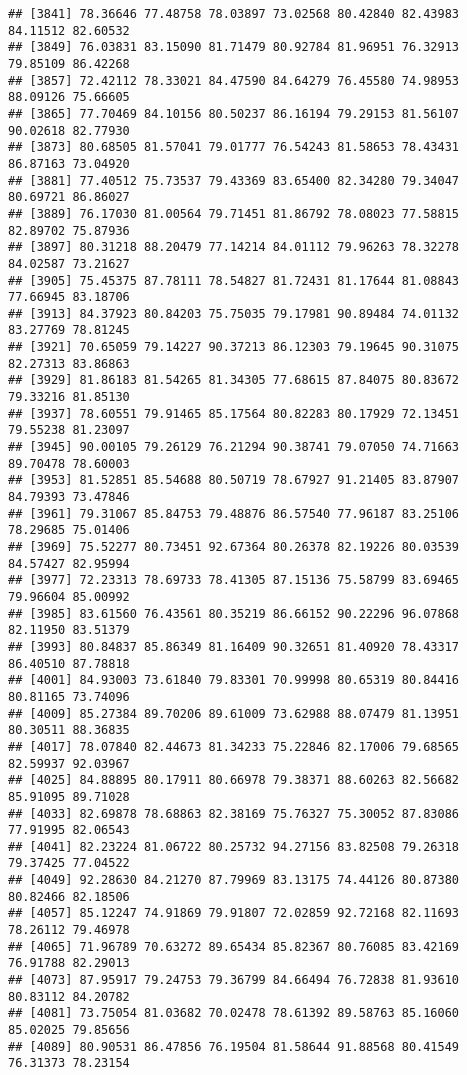 \documentclass[
]{article}
\begin{document}
\begin{verbatim}
## [3841] 78.36646 77.48758 78.03897 73.02568 80.42840 82.43983 84.11512 82.60532
## [3849] 76.03831 83.15090 81.71479 80.92784 81.96951 76.32913 79.85109 86.42268
## [3857] 72.42112 78.33021 84.47590 84.64279 76.45580 74.98953 88.09126 75.66605
## [3865] 77.70469 84.10156 80.50237 86.16194 79.29153 81.56107 90.02618 82.77930
## [3873] 80.68505 81.57041 79.01777 76.54243 81.58653 78.43431 86.87163 73.04920
## [3881] 77.40512 75.73537 79.43369 83.65400 82.34280 79.34047 80.69721 86.86027
## [3889] 76.17030 81.00564 79.71451 81.86792 78.08023 77.58815 82.89702 75.87936
## [3897] 80.31218 88.20479 77.14214 84.01112 79.96263 78.32278 84.02587 73.21627
## [3905] 75.45375 87.78111 78.54827 81.72431 81.17644 81.08843 77.66945 83.18706
## [3913] 84.37923 80.84203 75.75035 79.17981 90.89484 74.01132 83.27769 78.81245
## [3921] 70.65059 79.14227 90.37213 86.12303 79.19645 90.31075 82.27313 83.86863
## [3929] 81.86183 81.54265 81.34305 77.68615 87.84075 80.83672 79.33216 81.85130
## [3937] 78.60551 79.91465 85.17564 80.82283 80.17929 72.13451 79.55238 81.23097
## [3945] 90.00105 79.26129 76.21294 90.38741 79.07050 74.71663 89.70478 78.60003
## [3953] 81.52851 85.54688 80.50719 78.67927 91.21405 83.87907 84.79393 73.47846
## [3961] 79.31067 85.84753 79.48876 86.57540 77.96187 83.25106 78.29685 75.01406
## [3969] 75.52277 80.73451 92.67364 80.26378 82.19226 80.03539 84.57427 82.95994
## [3977] 72.23313 78.69733 78.41305 87.15136 75.58799 83.69465 79.96604 85.00992
## [3985] 83.61560 76.43561 80.35219 86.66152 90.22296 96.07868 82.11950 83.51379
## [3993] 80.84837 85.86349 81.16409 90.32651 81.40920 78.43317 86.40510 87.78818
## [4001] 84.93003 73.61840 79.83301 70.99998 80.65319 80.84416 80.81165 73.74096
## [4009] 85.27384 89.70206 89.61009 73.62988 88.07479 81.13951 80.30511 88.36835
## [4017] 78.07840 82.44673 81.34233 75.22846 82.17006 79.68565 82.59937 92.03967
## [4025] 84.88895 80.17911 80.66978 79.38371 88.60263 82.56682 85.91095 89.71028
## [4033] 82.69878 78.68863 82.38169 75.76327 75.30052 87.83086 77.91995 82.06543
## [4041] 82.23224 81.06722 80.25732 94.27156 83.82508 79.26318 79.37425 77.04522
## [4049] 92.28630 84.21270 87.79969 83.13175 74.44126 80.87380 80.82466 82.18506
## [4057] 85.12247 74.91869 79.91807 72.02859 92.72168 82.11693 78.26112 79.46978
## [4065] 71.96789 70.63272 89.65434 85.82367 80.76085 83.42169 76.91788 82.29013
## [4073] 87.95917 79.24753 79.36799 84.66494 76.72838 81.93610 80.83112 84.20782
## [4081] 73.75054 81.03682 70.02478 78.61392 89.58763 85.16060 85.02025 79.85656
## [4089] 80.90531 86.47856 76.19504 81.58644 91.88568 80.41549 76.31373 78.23154

\end{verbatim}
\end{document}
